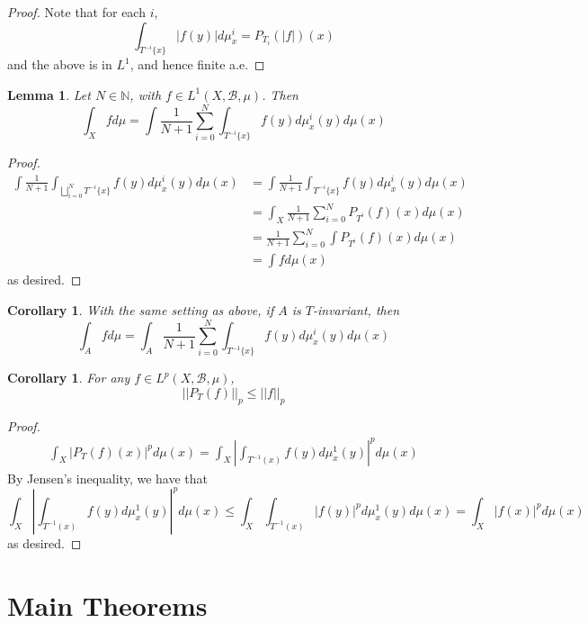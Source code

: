 \documentclass{article}
\newcommand{\N}{\mathbb{N}}
\newcommand{\B}{\mathcal{B}}
\newcommand{\norm}[1]{\left\vert\left\vert#1\right\vert\right\vert}
\newcommand{\abs}[1]{\left\vert#1\right\vert}
\newtheorem{corollary}[theorem]{Corollary}
\newtheorem{lemma}[theorem]{Lemma}
\theoremstyle{definition}
\begin{document}
\begin{proof}
    Note that for each $ i $,
    \[
    \int_{T^{-i}\{x\}}\abs{f(y)}d\mu^i_x = P_{T_i}(\abs{f})(x)
    \]
    and the above is in $ L^1 $, and hence finite a.e.
\end{proof}
\begin{lemma}\label{localglobal}
    Let $ N\in \N $, with $ f\in L^1(X,\B,\mu) $. Then
    \[
    \int_X fd\mu = \int \frac{1}{N+1}\sum_{i=0}^N \int_{T^{-i}\{x\}} f(y)d\mu^i_x(y) d\mu(x)
    \]
\end{lemma}
\begin{proof}
    \begin{align*}
        \int \frac{1}{N+1}\int_{\bigsqcup_{i=0}^N T^{-i}\{x\}} f(y)d\mu^i_x(y) d\mu(x)&= \int \frac{1}{N+1} \int_{T^{-i}\{x\}} f(y)d\mu^i_x(y)d\mu(x)\\
        &= \int_X \frac{1}{N+1}\sum_{i=0}^N P_{T^{i}}(f)(x)d\mu(x)\\
        &= \frac{1}{N+1}\sum_{i=0}^N \int P_{T^i}(f)(x)d\mu(x)\\
        &= \int fd\mu(x)
    \end{align*}
    as desired.
\end{proof}
\begin{corollary}
    With the same setting as above, if $ A $ is $ T $-invariant, then
    \[
    \int_A f d\mu = \int_A \frac{1}{N+1} \sum_{i=0}^N \int_{T^{-1}\{x\}} f(y)d\mu_x^i(y)d\mu(x) 
    \]
\end{corollary}
\begin{corollary}\label{Lp-contraction}
    For any $ f\in L^p(X,\mathcal{B},\mu) $, 
    \[
    \norm{P_T(f)}_p \leq \norm{f}_p
    \]
\end{corollary}
\begin{proof}
    \begin{align*}
        \int_X \abs{P_T(f)(x)}^p d\mu(x) = \int_X \abs{\int_{T^{-1}(x)} f(y)d\mu_x^1(y)}^p d\mu(x)
    \end{align*}
    By Jensen's inequality, we have that
    \[
    \int_X \abs{\int_{T^{-1}(x)} f(y)d\mu_x^1(y)}^p d\mu(x) \leq \int_X \int_{T^{-1}(x)} \abs{f(y)}^pd\mu_x^1(y)d\mu(x) = \int_X \abs{f(x)}^pd\mu(x)
    \]
    as desired.
\end{proof}
\section{Main Theorems}
\end{document}
